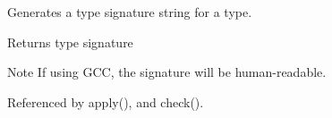 Generates a type signature string for a type. 

\begin{DoxyReturn}{Returns}
type signature 
\end{DoxyReturn}
\begin{DoxyNote}{Note}
If using G\-C\-C, the signature will be human-\/readable. 
\end{DoxyNote}


Referenced by apply(), and check().


